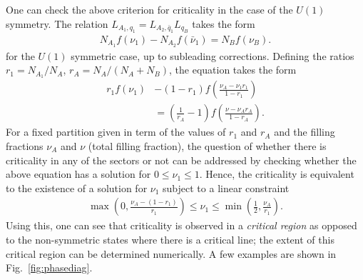 \documentclass[aps,pra,reprint,superscriptaddress,twocolumn,notitlepage]{revtex4-1}
\numberwithin{equation}{section}
\begin{document}
One can check the above criterion for criticality in the case of the $U(1)$ symmetry. The relation $L_{A_1,q_1} = L_{A_2,\bar{q}_1} L_{q_B}$ takes the form \begin{align}\label{eq:criticiality_U(1)}
    N_{A_1} f(\nu_1) - N_{A_2} f(\bar{\nu}_1) = N_B f(\nu_B).
\end{align}
for the $U(1)$  symmetric case, up to subleading corrections.
Defining the ratios $r_1 = N_{A_1}/N_A$, $r_A = N_{A}/(N_A+N_B)$,
the equation takes the form 
\begin{equation}
    \begin{aligned}
        r_1 f(\nu_1) & -
        (1-r_1)  f\left(\frac{\nu_A-\nu_1 r_1}{1-r_1}\right)  \\
        &= \left(\frac{1}{r_A}-1\right) f\left(\frac{\nu-\nu_A r_A}{1-r_A}\right).
    \end{aligned}
\end{equation}
For a fixed partition given in term of the values of $r_1$ and $r_A$ and the filling fractions $\nu_A$ and $\nu$ (total filling fraction), the question of whether there is criticality in any of the sectors or not can be addressed by checking whether the above equation has a solution for $0\leq \nu_1\leq 1$.
Hence, the criticality is equivalent to the existence of a solution for $\nu_1$ subject to a linear constraint
\begin{align}
    \max \left(0, \frac{\nu_A-(1-r_1)}{r_1} \right) \leq \nu_1 \leq \min \left( \frac{1}{2}, \frac{\nu_A}{r_1} \right).
\end{align}
Using this, one can see that criticality is observed in a {\it critical region} as opposed to the non-symmetric states where there is a critical line; the extent of this critical region can be determined numerically. A few examples are shown in Fig.~\ref{fig:phasediag}.  
\end{document}

